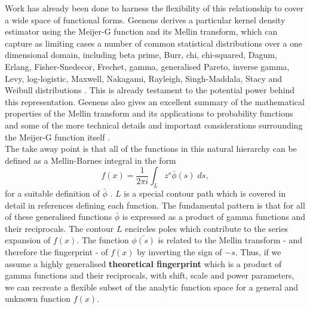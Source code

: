 \documentclass{article}
\begin{document}
Work has already been done to harness the flexibility of this relationship to cover a wide space of functional forms. Geenens  derives a particular kernel density estimator \cite{Geenens2017} using the Meijer-G function and its Mellin transform, which can capture as limiting cases a number of common statistical distributions over a one dimensional domain, including beta prime, Burr, chi, chi-squared, Dagum, Erlang, Fisher-Snedecor, Frechet, gamma, generalised Pareto, inverse gamma, Levy, log-logistic, Maxwell, Nakagami, Rayleigh, Singh-Maddala, Stacy and Weibull distributions \cite{Geenens2017}. This is already testament to the potential power behind this representation. Geenens also gives an excellent summary of the mathematical properties of the Mellin transform and its applications to probability functions and some of the more technical details and important considerations surrounding the Meijer-G function itself \cite{Geenens2017}. \\

The take away point is that all of the functions in this natural hierarchy can be defined as a Mellin-Barnes integral in the form
\begin{equation}
f(x) = \frac{1}{2\pi i}\int_L z^s \bar{\phi}(s)\;ds,
\label{eqn:contour}
\end{equation}
for a suitable definition of $\bar{\phi}$ \cite{Rathie1997}. $L$ is a special contour path which is covered in detail in references defining each function. The fundamental pattern is that for all of these generalised functions $\bar{\phi}$ is expressed as a product of gamma functions and their reciprocals. The contour $L$ encircles poles which contribute to the series expansion of $f(x)$. The function $\bar{\phi(s)}$ is related to the Mellin transform - and therefore the fingerprint - of $f(x)$ by inverting the sign of $-s$. Thus, if we assume a highly generalised \textbf{theoretical fingerprint} which is a product of gamma functions and their reciprocals, with shift, scale and power parameters, we can recreate a flexible subset of the analytic function space for a general and unknown function $f(x)$. \\
\end{document}
